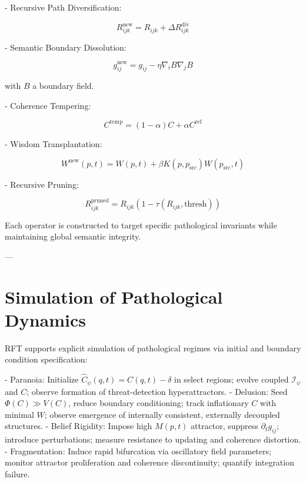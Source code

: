- Recursive Path Diversification:

\begin{equation}
R_{ijk}^{\text{new}} = R_{ijk} + \Delta R_{ijk}^{\text{div}}
\end{equation}

- Semantic Boundary Dissolution:

\begin{equation}
g_{ij}^{\text{new}} = g_{ij} - \eta \nabla_i B \nabla_j B
\end{equation}

with $B$ a boundary field.

- Coherence Tempering:

\begin{equation}
C^{\text{temp}} = (1-\alpha)C + \alpha C^{\text{ref}}
\end{equation}

- Wisdom Transplantation:

\begin{equation}
W^{\text{new}}(p,t) = W(p,t) + \beta K(p,p_{\text{src}}) W(p_{\text{src}},t)
\end{equation}

- Recursive Pruning:

\begin{equation}
R_{ijk}^{\text{pruned}} = R_{ijk} (1 - \tau(R_{ijk}, \text{thresh}))
\end{equation}

Each operator is constructed to target specific pathological invariants while maintaining global semantic integrity.

---

\section{Simulation of Pathological Dynamics}

RFT supports explicit simulation of pathological regimes via initial and boundary condition specification:

- Paranoia: Initialize $\hat{C}_{\psi}(q,t) = C(q,t) - \delta$ in select regions; evolve coupled $\mathcal{I}_{\psi}$ and $C$; observe formation of threat-detection hyperattractors.
- Delusion: Seed $\Phi(C) \gg V(C)$, reduce boundary conditioning; track inflationary $C$ with minimal $W$; observe emergence of internally consistent, externally decoupled structures.
- Belief Rigidity: Impose high $M(p,t)$ attractor, suppress $\partial_t g_{ij}$; introduce perturbations; measure resistance to updating and coherence distortion.
- Fragmentation: Induce rapid bifurcation via oscillatory field parameters; monitor attractor proliferation and coherence discontinuity; quantify integration failure.

